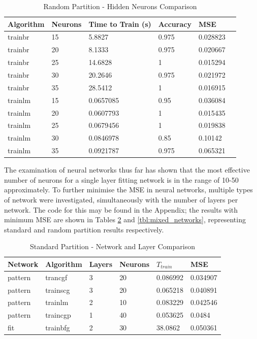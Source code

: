 \documentclass[a4paper, 10pt, conference]{ieeeconf}
\begin{document}
\begin{table}
\centering
\caption{Random Partition - Hidden Neurons Comparison}
\label{tbl:mixed}
\begin{tabular}{llllll}
\hline
\textbf{Algorithm} & \textbf{Neurons} & \textbf{Time to Train (s)} & \textbf{Accuracy} & \textbf{MSE} \\ \hline
trainbr & 15 & 5.8827 & 0.975 & 0.028823 \\ \hline
trainbr & 20 & 8.1333 & 0.975 & 0.020667 \\ \hline
trainbr & 25 & 14.6828 & 1 & 0.015294 \\ \hline
trainbr & 30 & 20.2646 & 0.975 & 0.021972 \\ \hline
trainbr & 35 & 28.5412 & 1 & 0.016915 \\ \hline

trainlm & 15 & 0.0657085 & 0.95 & 0.036084 \\ \hline
trainlm & 20 & 0.0607793 & 1 & 0.015435 \\ \hline
trainlm & 25 & 0.0679456 & 1 & 0.019838 \\ \hline
trainlm & 30 & 0.0846978 & 0.85 & 0.10142 \\ \hline
trainlm & 35 & 0.0921787 & 0.975 & 0.065321 \\ \hline
\end{tabular}
\end{table}


The examination of neural networks thus far has shown that the most effective number of neurons for a single layer fitting network is in the range of 10-50 approximately. To further minimise the MSE in neural networks, multiple types of network were investigated, simultaneously with the number of layers per network. The code for this may be found in the Appendix; the results with minimum MSE are shown in Tables \ref{tbl:unmixed_networks} and \ref{tbl:mixed_networks}, representing standard and random partition results respectively.

\begin{table}
\centering
\caption{Standard Partition - Network and Layer Comparison}
\label{tbl:unmixed_networks}
\begin{tabular}{llllll}
\hline
\textbf{Network} & \textbf{Algorithm} & \textbf{Layers} & \textbf{Neurons} & \textbf{$T_{train}$} & \textbf{MSE} \\ \hline
pattern & trancgf & 3 & 20 & 0.086992 & 0.034907 \\ \hline
pattern & trainscg & 3 & 20 & 0.065218 & 0.040891 \\ \hline
pattern & trainlm & 2 & 10 & 0.083229 & 0.042546 \\ \hline
pattern & traincgp & 1 & 40 & 0.053625 & 0.0484 \\ \hline
fit & trainbfg & 2 & 30 & 38.0862 & 0.050361 \\ \hline
\end{tabular}
\end{table}
\end{document}
